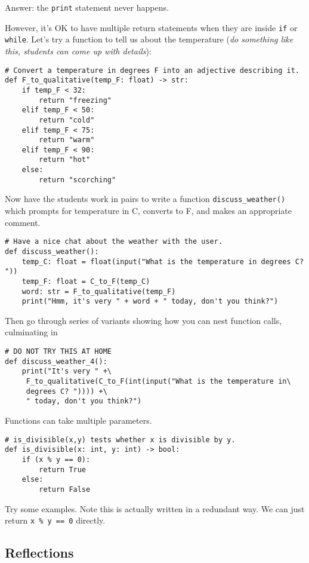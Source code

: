 \documentclass{article}
\begin{document}
Answer: the \verb|print| statement never happens.

However, it's OK to have multiple return statements when they are
inside \verb|if| or \verb|while|.  Let's try a function to tell us
about the temperature (\emph{do something like this, students can come
  up with details}):
\begin{verbatim}
# Convert a temperature in degrees F into an adjective describing it.
def F_to_qualitative(temp_F: float) -> str:
    if temp_F < 32:
        return "freezing"
    elif temp_F < 50:
        return "cold"
    elif temp_F < 75:
        return "warm"
    elif temp_F < 90:
        return "hot"
    else:
        return "scorching"
\end{verbatim}

Now have the students work in pairs to write a function
\verb|discuss_weather()| which prompts for temperature in C, converts
to F, and makes an appropriate comment.

\begin{verbatim}
# Have a nice chat about the weather with the user.
def discuss_weather():
    temp_C: float = float(input("What is the temperature in degrees C? "))
    temp_F: float = C_to_F(temp_C)
    word: str = F_to_qualitative(temp_F)
    print("Hmm, it's very " + word + " today, don't you think?")
\end{verbatim}

Then go through series of variants showing how you can nest function
calls, culminating in

\begin{verbatim}
# DO NOT TRY THIS AT HOME
def discuss_weather_4():
    print("It's very " +\
     F_to_qualitative(C_to_F(int(input("What is the temperature in\
     degrees C? ")))) +\
     " today, don't you think?")
\end{verbatim}

Functions can take multiple parameters.

\begin{verbatim}
# is_divisible(x,y) tests whether x is divisible by y.
def is_divisible(x: int, y: int) -> bool:
    if (x % y == 0):
        return True
    else:
        return False
\end{verbatim}

Try some examples.  Note this is actually written in a redundant way.  We
can just return \verb|x % y == 0| directly.

\subsection*{Reflections}
\end{document}
